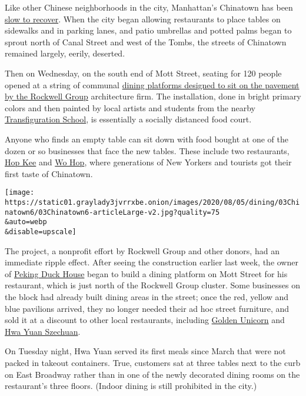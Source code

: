 Like other Chinese neighborhoods in the city, Manhattan's Chinatown has
been
\href{https://www.nytimes3xbfgragh.onion/2020/06/30/nyregion/chinatown-coronavirus-nyc.html?searchResultPosition=1}{slow
to recover}. When the city began allowing restaurants to place tables on
sidewalks and in parking lanes, and patio umbrellas and potted palms
began to sprout north of Canal Street and west of the Tombs, the streets
of Chinatown remained largely, eerily, deserted.

Then on Wednesday, on the south end of Mott Street, seating for 120
people opened at a string of communal
\href{https://www.rockwellgroup.com/projects/dineout-nyc\#:~:text=Our\%20solution\%2C\%20DineOut\%20NYC\%2C\%20designed,to\%20feel\%20safe\%20and\%20comfortable.}{dining
platforms designed to sit on the pavement by the Rockwell Group}
architecture firm. The installation, done in bright primary colors and
then painted by local artists and students from the nearby
\href{https://www.transfigurationschoolnyc.org/}{Transfiguration
School}, is essentially a socially distanced food court.

Anyone who finds an empty table can sit down with food bought at one of
the dozen or so businesses that face the new tables. These include two
restaurants, \href{http://www.hop-kee-nyc.com/}{Hop Kee} and
\href{https://www.nytimes3xbfgragh.onion/2010/07/07/dining/reviews/07dinbriefs.html}{Wo
Hop}, where generations of New Yorkers and tourists got their first
taste of Chinatown.

\texttt{[image: https://static01.graylady3jvrrxbe.onion/images/2020/08/05/dining/03Chinatown6/03Chinatown6-articleLarge-v2.jpg?quality=75\\\&auto=webp\\\&disable=upscale]}

The project, a nonprofit effort by Rockwell Group and other donors, had
an immediate ripple effect. After seeing the construction earlier last
week, the owner of \href{https://www.pekingduckhousenyc.com/}{Peking
Duck House} began to build a dining platform on Mott Street for his
restaurant, which is just north of the Rockwell Group cluster. Some
businesses on the block had already built dining areas in the street;
once the red, yellow and blue pavilions arrived, they no longer needed
their ad hoc street furniture, and sold it at a discount to other local
restaurants, including
\href{http://www.goldenunicornrestaurant.com/}{Golden Unicorn} and
\href{https://www.nytimes3xbfgragh.onion/2018/02/13/dining/hwa-yuan-szechuan-review-chinese-food.html}{Hwa
Yuan Szechuan}.

On Tuesday night, Hwa Yuan served its first meals since March that were
not packed in takeout containers. True, customers sat at three tables
next to the curb on East Broadway rather than in one of the newly
decorated dining rooms on the restaurant's three floors. (Indoor dining
is still prohibited in the city.)


